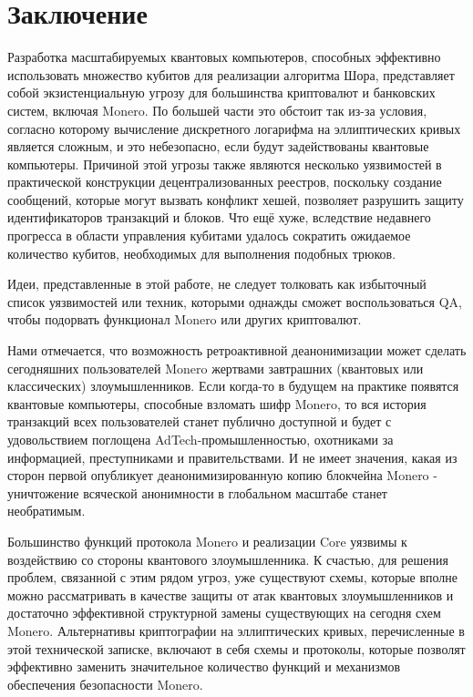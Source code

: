 \documentclass{mrl}
\begin{document}
\break


\section{Заключение}

Разработка масштабируемых квантовых компьютеров, способных эффективно использовать множество кубитов для реализации алгоритма Шора, представляет собой экзистенциальную угрозу для большинства криптовалют и банковских систем, включая Monero. По большей части это обстоит так из-за условия, согласно которому вычисление дискретного логарифма на эллиптических кривых является сложным, и это небезопасно, если будут задействованы квантовые компьютеры. Причиной этой угрозы также являются несколько уязвимостей в практической конструкции децентрализованных реестров, поскольку создание сообщений, которые могут вызвать конфликт хешей, позволяет разрушить защиту идентификаторов транзакций и блоков. Что ещё хуже, вследствие недавнего прогресса в области управления кубитами удалось сократить ожидаемое количество кубитов, необходимых для выполнения подобных трюков.

Идеи, представленные в этой работе, не следует толковать как избыточный список уязвимостей или техник, которыми однажды сможет воспользоваться QA, чтобы подорвать функционал Monero или других криптовалют.

Нами отмечается, что возможность ретроактивной деанонимизации может сделать сегодняшних пользователей Monero жертвами завтрашних (квантовых или классических) злоумышленников. Если когда-то в будущем на практике появятся квантовые компьютеры, способные взломать шифр Monero, то вся история транзакций всех пользователей станет публично доступной и будет с удовольствием поглощена AdTech-промышленностью, охотниками за информацией, преступниками и правительствами. И не имеет значения, какая из сторон первой опубликует деанонимизированную копию блокчейна Monero - уничтожение всяческой анонимности в глобальном масштабе станет необратимым.

Большинство функций протокола Monero и реализации Core уязвимы к воздействию со стороны квантового злоумышленника. К счастью, для решения проблем, связанной с этим рядом угроз, уже существуют схемы, которые вполне можно рассматривать в качестве защиты от атак квантовых злоумышленников и достаточно эффективной структурной замены существующих на сегодня схем Monero. Альтернативы криптографии на эллиптических кривых, перечисленные в этой технической записке, включают в себя схемы и протоколы, которые позволят эффективно заменить значительное количество функций и механизмов обеспечения безопасности Monero. 
\end{document}
